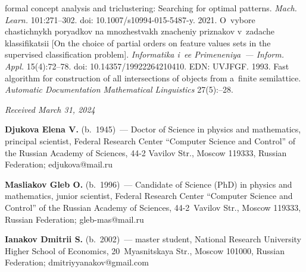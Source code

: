 \begin{multicols}{2}
{{\begin{thebibliography}{99}
formal concept analysis and triclustering: Searching for optimal patterns. \textit{Mach. Learn.} 
101:271--302. doi: 10.1007/s10994-015-5487-y.
 2021. O~vybore chastichnykh poryadkov na 
mnozhestvakh znacheniy pri\-zna\-kov v~zadache klassifikatsii [On the choice of partial orders on 
feature values sets in the supervised classification problem]. \textit{Informatika i~ee 
Primeneniya~--- Inform. Appl.} 15(4):72--78. doi: 10.14357/19922264210410. EDN: UVJFGF.
 1993. Fast algorithm for construction of all intersections of objects from 
a~finite semilattice.  \textit{Automatic Documentation Mathematical Linguistics} 27(5):--28.

\end{thebibliography}

 }
 }

\end{multicols}

\vspace*{-6pt}

\hfill{\small\textit{Received March 31, 2024}} 

\vspace*{-18pt}

\Contr

\vspace*{-3pt}

\noindent
\textbf{Djukova Elena V.} (b.\ 1945)~--- Doctor of Science in physics and mathematics, principal 
scientist, Federal Research Center ``Computer Science and Control'' of the Russian Academy of 
Sciences, 44-2 Vavilov Str., Moscow 119333, Russian Federation; \mbox{edjukova@mail.ru}

\vspace*{3pt}


\noindent
\textbf{Masliakov Gleb O.} (b.\ 1996)~--- Candidate of Science (PhD) in physics and mathematics, 
junior scientist, Federal Research Center ``Computer Science and Control'' of the Russian 
Academy of Sciences, 44-2~Vavilov Str., Moscow 119333, Russian Federation; 
\mbox{gleb-mas@mail.ru}

\vspace*{3pt}

\noindent
\textbf{Ianakov Dmitrii S.} (b.\ 2002)~--- master student, National Research University Higher 
School of Economics, 20~Myasnitskaya Str., Moscow 101000, Russian Federation; 
\mbox{dmitriyyanakov@gmail.com}



\label{end\stat}

\renewcommand{\bibname}{\protect\rm Литература} 
